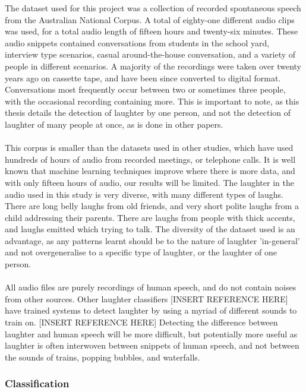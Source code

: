 \documentclass[a4paper,11pt,notitlepage]{article}
\begin{document}
The dataset used for this project was a collection of recorded spontaneous speech from the Australian National Corpus. A total of eighty-one different audio clips was used, for a total audio length of fifteen hours and twenty-six minutes. These audio snippets contained conversations from students in the school yard, interview type scenarios, casual around-the-house conversation, and a variety of people in different scenarios. A majority of the recordings were taken over twenty years ago on cassette tape, and have been since converted to digital format. Conversations most frequently occur between two or sometimes three people, with the occasional recording containing more. This is important to note, as this thesis details the detection of laughter by one person, and not the detection of laughter of many people at once, as is done in other papers.\cite{kennedy2004laughter}\\
\\
This corpus is smaller than the datasets used in other studies, which have used hundreds of hours of audio from recorded meetings, or telephone calls. It is well known that machine learning techniques improve where there is more data, and with only fifteen hours of audio, our results will be limited. The laughter in the audio used in this study is very diverse, with many different types of laughs. There are long belly laughs from old friends, and very short polite laughs from a child addressing their parents. There are laughs from people with thick accents, and laughs emitted which trying to talk. The diversity of the dataset used is an advantage, as any patterns learnt should be to the nature of laughter 'in-general' and not overgeneralise to a specific type of laughter, or the laughter of one person.\\
\\
All audio files are purely recordings of human speech, and do not contain noises from other sources. Other laughter classifiers [INSERT REFERENCE HERE] have trained systems to detect laughter by using a myriad of different sounds to train on. [INSERT REFERENCE HERE] Detecting the difference between laughter and human speech will be more difficult, but potentially more useful as laughter is often interwoven between snippets of human speech, and not between the sounds of trains, popping bubbles, and waterfalls.

\subsubsection{Classification}
\end{document}
